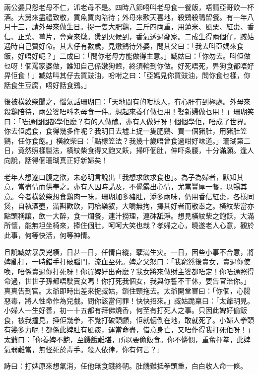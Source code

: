 \documentclass[a5paper, 12pt, openany]{book} %
\begin{document}
	兩公婆只怨老母不仁，沠老母不是。四時八節唔呌老母食一餐飯，唔請亞哥飲一杯酒。大舅來盡禮致敬，買魚買肉陪待；外母來歡天喜地，殺鷄殺鴨留餐。有一年八月十三，請外母來做生日。捉一隻大肥鷄，三斤四両重，用蓮米、風栗、紅棗、香信、正菜、薑片，會齊來燉。煲到火候到，香氣透過鄰家。二成生得兩個仔，臧姑遇時自己贊好命。其大仔有數歲，見燉鷄待外婆，問其父曰：「我去呌亞媽來食飯，好唔好呢？」二成曰：「問你老母方能做得主意。」臧姑曰：「你勿去。呌佢做乜呀！個罵家婆做，誰知自己係嫩狗乸，終須輪到你做。好死唔死，畀狗食都唔好畀佢食！」臧姑呌其仔去買豉油，吩咐之曰：「亞媽見你買豉油，問你食乜樣，你話食生豆腐，唔好話食鷄。」

	後被橫紋柴聞之，惱氣話珊瑚曰：「天地間有的咁樣人，冇心肝冇到極處。外母來殺鷄陪待，兩公婆唔呌老母食一件。想起來養仔做乜用！娶新婦做乜用！」珊瑚笑曰：「唔通個個都學佢麽？有的人做醜，亦有人做好呀！個個學佢，唔成了世界。你去佢處食，食得幾多件呢？我明日去墟上捉一隻肥鷄、買一個豬肚，用豬肚笠鷄，任你食飽。」橫紋柴曰：「點樣笠法？我幾十歲唔曾食過咁好味道。」珊瑚第二日，竟然照樣製法，橫紋柴食得又飽又飫，掃吓個肚，伸吓条腰，十分滿願。逢人向說，話得個珊瑚真正好新婦矣！

	老年人想遂口腹之欲，未必明言說出「我想求飲求食也」。為子為婦者，默知其意，當盡情而供奉之。亦有人因時講及，不覺露出心情，尤當豐厚一餐，以暢其意。今者橫紋柴想食鷄肉一味，珊瑚加多豬肚，添多兩味，仍用香信紅棗，各樣同煲，自執酒壺，滿斟歡飲，同枱樂叙，大嚼無拘，擇其好者而敬奉之。橫紋柴當亦點頭稱讓，飲一大醉，食一爛餐，連汁撈理，連砵舐淨。想見橫紋柴之飽飫，大滿所懷，能無坦坐椅來，捧住個肚，呵呵大笑也哉？孝婦之心，曉遂老人心意，觀於此事，何等快活，何等神情。

	且說臧姑暴戾兇橫，日甚一日，任情自縱，孽滿生灾。一日，因些小事不合意，將婢亂打，一時錯手打破腦門，流血至死。婢之父怒曰：「我窮然後賣女，賣過你使喚，唔係賣過你打死呀！你買婢好出奇麽？我女將來做財主婆都唔定！你唔通照得命過，世世子孫都唔駛賣女嗎！你打死我個女，我與你誓不干休，要告官治你。」真真告到官。太爺即時出差來捉臧姑，鎖住頸拖去。太爺開堂審曰：「你個，心腸惡毒，將人性命作為兒戲。問你該當何罪！快快招來。」臧姑跪稟曰：「太爺明見。小婦人一生好善，初一十五都有拜佛燒香，何至有打死人之事。只因此婢好偷飯食，被我撞見，捶佢幾拳，不覺打破頭顱，佢就轆倒在地，敢就死了。小婦人拳頭有幾多力呢！都係此婢肚有風痰，運當命盡，借意身亡，又唔作得我打死佢呀！」太爺曰：「你養婢不飽，至饑餓難堪，所以要偷飯食。你不憐憫，重奮揮拳，此婢氣弱難當，無怪死於毒手。殺人依律，你有何言？」

	詩曰：打婢原來想氣消，任他無食餓終朝。肚饑難抵拳頭重，白白收人命一條。
\end{document}
